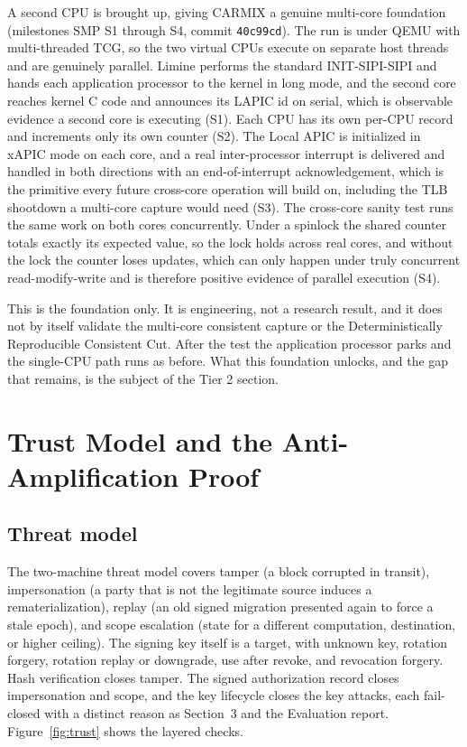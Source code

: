 \documentclass[10pt,twocolumn]{article}
\newcommand{\carmix}{CARMIX}
\begin{document}
A second CPU is brought up, giving \carmix{} a genuine multi-core foundation
(milestones SMP S1 through S4, commit \texttt{40c99cd}). The run is under QEMU
with multi-threaded TCG, so the two virtual CPUs execute on separate host threads
and are genuinely parallel. Limine performs the standard INIT-SIPI-SIPI and hands
each application processor to the kernel in long mode, and the second core reaches
kernel C code and announces its LAPIC id on serial, which is observable evidence a
second core is executing (S1). Each CPU has its own per-CPU record and increments
only its own counter (S2). The Local APIC is initialized in xAPIC mode on each
core, and a real inter-processor interrupt is delivered and handled in both
directions with an end-of-interrupt acknowledgement, which is the primitive every
future cross-core operation will build on, including the TLB shootdown a
multi-core capture would need (S3). The cross-core sanity test runs the same work
on both cores concurrently. Under a spinlock the shared counter totals exactly its
expected value, so the lock holds across real cores, and without the lock the
counter loses updates, which can only happen under truly concurrent
read-modify-write and is therefore positive evidence of parallel execution (S4).

This is the foundation only. It is engineering, not a research result, and it does
not by itself validate the multi-core consistent capture or the Deterministically
Reproducible Consistent Cut. After the test the application processor parks and
the single-CPU path runs as before. What this foundation unlocks, and the gap that
remains, is the subject of the Tier 2 section.

\section{Trust Model and the Anti-Amplification Proof}

\subsection{Threat model}

The two-machine threat model covers tamper (a block corrupted in transit),
impersonation (a party that is not the legitimate source induces a
rematerialization), replay (an old signed migration presented again to force a
stale epoch), and scope escalation (state for a different computation,
destination, or higher ceiling). The signing key itself is a target, with unknown
key, rotation forgery, rotation replay or downgrade, use after revoke, and
revocation forgery. Hash verification closes tamper. The signed authorization
record closes impersonation and scope, and the key lifecycle closes the key
attacks, each fail-closed with a distinct reason as Section~3 and the Evaluation
report. Figure~\ref{fig:trust} shows the layered checks.
\end{document}
